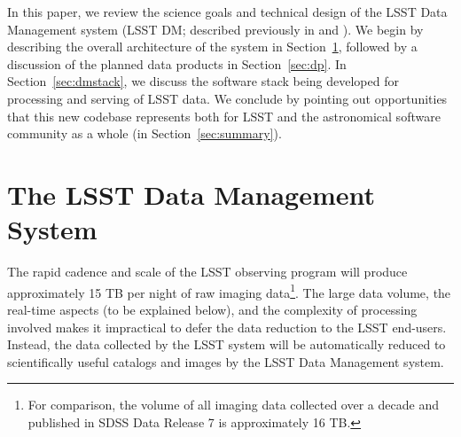 \documentclass[11pt,twoside]{article}
\begin{document}
In this paper, we review the science goals and technical design of the
LSST Data Management system
(LSST DM; described previously in \citealt{2007ASPC..376....3K} and \citealt{2010SPIE.7740E..1NK}).
We begin by describing the overall architecture of the system in
Section~\ref{sec:dm}, followed by a discussion of the planned data
products in Section~\ref{sec:dp}. In Section~\ref{sec:dmstack}, we
discuss the software stack being developed for processing and serving
of LSST data. We  conclude by pointing out opportunities that this new codebase
represents both for LSST and the astronomical software community as
a whole (in Section~\ref{sec:summary}).

\section{ The LSST Data Management System }
\label{sec:dm}

The rapid cadence and scale of the LSST observing program will produce
approximately 15 TB per night of raw imaging data\footnote{For
  comparison, the volume of all imaging data collected over a decade
  and published in SDSS Data Release 7 \citep{2009ApJS..182..543A} is approximately 16 TB.}. The large data volume, the real-time aspects
(to be explained below), and the complexity of processing involved makes it impractical to defer the data reduction to the LSST end-users. Instead, the data collected by the LSST system will be automatically reduced to scientifically useful catalogs and images by the LSST Data Management system.
\\
\end{document}
